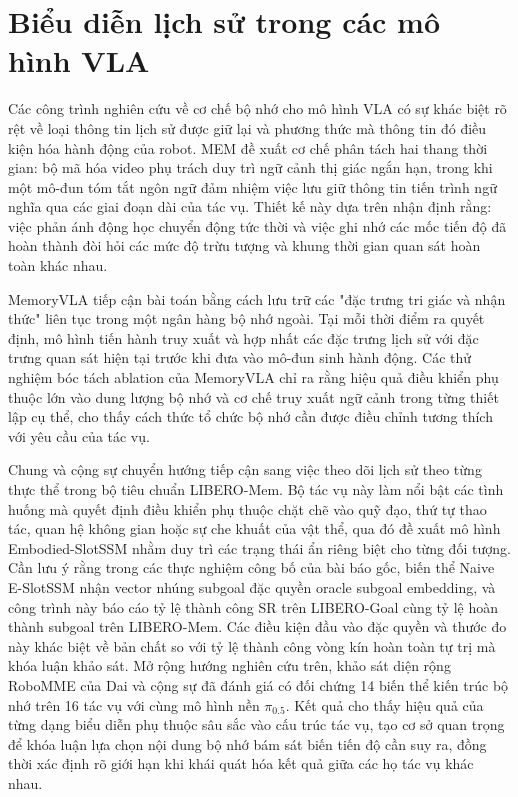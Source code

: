 \section{Biểu diễn lịch sử trong các mô hình VLA}

Các công trình nghiên cứu về cơ chế bộ nhớ cho mô hình VLA có sự khác biệt rõ rệt về loại thông tin lịch sử được giữ lại và phương thức mà thông tin đó điều kiện hóa hành động của robot. MEM \cite{mem2026} đề xuất cơ chế phân tách hai thang thời gian: bộ mã hóa video phụ trách duy trì ngữ cảnh thị giác ngắn hạn, trong khi một mô-đun tóm tắt ngôn ngữ đảm nhiệm việc lưu giữ thông tin tiến trình ngữ nghĩa qua các giai đoạn dài của tác vụ. Thiết kế này dựa trên nhận định rằng: việc phản ánh động học chuyển động tức thời và việc ghi nhớ các mốc tiến độ đã hoàn thành đòi hỏi các mức độ trừu tượng và khung thời gian quan sát hoàn toàn khác nhau.

MemoryVLA \cite{memoryvla2026} tiếp cận bài toán bằng cách lưu trữ các "đặc trưng tri giác và nhận thức" liên tục trong một ngân hàng bộ nhớ ngoài. Tại mỗi thời điểm ra quyết định, mô hình tiến hành truy xuất và hợp nhất các đặc trưng lịch sử với đặc trưng quan sát hiện tại trước khi đưa vào mô-đun sinh hành động. Các thử nghiệm bóc tách ablation của MemoryVLA chỉ ra rằng hiệu quả điều khiển phụ thuộc lớn vào dung lượng bộ nhớ và cơ chế truy xuất ngữ cảnh trong từng thiết lập cụ thể, cho thấy cách thức tổ chức bộ nhớ cần được điều chỉnh tương thích với yêu cầu của tác vụ.

Chung và cộng sự \cite{liberomem2025} chuyển hướng tiếp cận sang việc theo dõi lịch sử theo từng thực thể trong bộ tiêu chuẩn LIBERO-Mem. Bộ tác vụ này làm nổi bật các tình huống mà quyết định điều khiển phụ thuộc chặt chẽ vào quỹ đạo, thứ tự thao tác, quan hệ không gian hoặc sự che khuất của vật thể, qua đó đề xuất mô hình Embodied-SlotSSM nhằm duy trì các trạng thái ẩn riêng biệt cho từng đối tượng. Cần lưu ý rằng trong các thực nghiệm công bố của bài báo gốc, biến thể Naive E-SlotSSM nhận vector nhúng subgoal đặc quyền oracle subgoal embedding, và công trình này báo cáo tỷ lệ thành công SR trên LIBERO-Goal cùng tỷ lệ hoàn thành subgoal trên LIBERO-Mem. Các điều kiện đầu vào đặc quyền và thước đo này khác biệt về bản chất so với tỷ lệ thành công vòng kín hoàn toàn tự trị mà khóa luận khảo sát. Mở rộng hướng nghiên cứu trên, khảo sát diện rộng RoboMME của Dai và cộng sự \cite{robomme2026} đã đánh giá có đối chứng 14 biến thể kiến trúc bộ nhớ trên 16 tác vụ với cùng mô hình nền $\pi_{0.5}$. Kết quả cho thấy hiệu quả của từng dạng biểu diễn phụ thuộc sâu sắc vào cấu trúc tác vụ, tạo cơ sở quan trọng để khóa luận lựa chọn nội dung bộ nhớ bám sát biến tiến độ cần suy ra, đồng thời xác định rõ giới hạn khi khái quát hóa kết quả giữa các họ tác vụ khác nhau.

